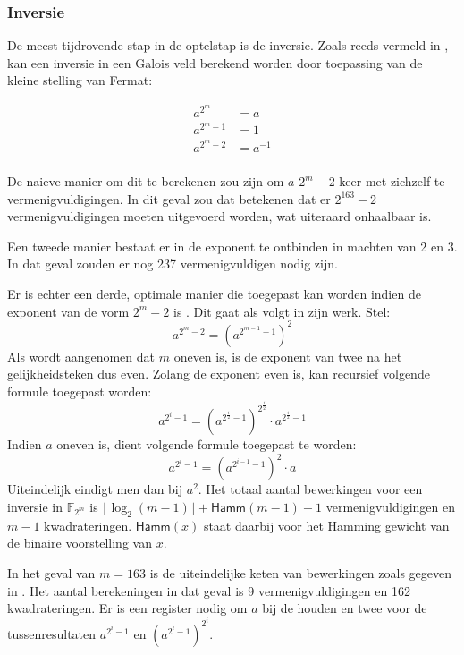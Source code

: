 \subsubsection{Inversie}

De meest tijdrovende stap in de optelstap is de inversie.  Zoals reeds vermeld in , kan een inversie in een Galois veld berekend worden door toepassing van de kleine stelling van Fermat:

\[\begin{aligned}
a^{2^m}		&= a\\
a^{2^m - 1}	&= 1\\
a^{2^m - 2}	&= a^{-1}\\
\end{aligned}\]


De naieve manier om dit te berekenen zou zijn om $a$ $2^m - 2$ keer met zichzelf te vermenigvuldigingen. In dit geval zou dat betekenen dat er $2^{163} - 2$ vermenigvuldigingen moeten uitgevoerd worden, wat uiteraard onhaalbaar is.

Een tweede manier bestaat er in de exponent te ontbinden in machten van 2 en 3. In dat geval zouden er nog 237 vermenigvuldigen nodig zijn.

Er is echter een derde, optimale manier die toegepast kan worden indien de exponent van de vorm $2^m - 2$ is \cite{batina-pkc, itoh}. Dit gaat als volgt in zijn werk. Stel:
\[a^{2^m - 2} = (a^{2^{m - 1} - 1})^2\]
Als wordt aangenomen dat $m$ oneven is, is de exponent van twee na het gelijkheidsteken dus even. Zolang de exponent even is, kan recursief volgende formule toegepast worden:
\[a^{2^i - 1} = (a^{2^{\frac{i}{2}} - 1})^{2^{\frac{i}{2}}} \cdot a^{2^{\frac{i}{2}} - 1}\]
Indien $a$ oneven is, dient volgende formule toegepast te worden:
\[a^{2^i - 1} = (a^{2^{i - 1} - 1})^2 \cdot a\]
Uiteindelijk eindigt men dan bij $a^2$. Het totaal aantal bewerkingen voor een inversie in $\mathbb{F}_{2^m}$ is $\lfloor\log_2(m - 1)\rfloor + \textsf{Hamm}(m - 1) + 1$ vermenigvuldigingen en $m - 1$ kwadrateringen. $\textsf{Hamm}(x)$ staat daarbij voor het Hamming gewicht van de binaire voorstelling van $x$.

In het geval van $m = 163$ is de uiteindelijke keten van bewerkingen zoals gegeven in . Het aantal berekeningen in dat geval is 9 vermenigvuldigingen en 162 kwadrateringen. Er is een register nodig om $a$ bij de houden en twee voor de tussenresultaten $a^{2^i - 1}$ en $(a^{2^i - 1})^{2^i}$.

